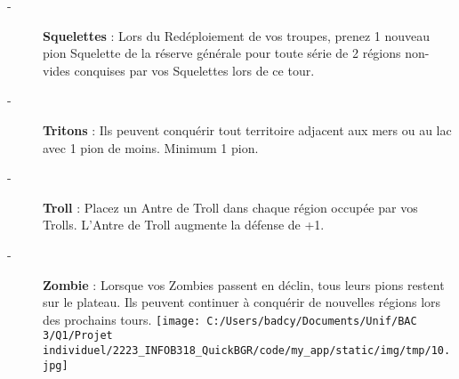 \documentclass{scrartcl}%
\begin{document}
\begin{description}
%
\item[{-} ]%
%
\textcolor{mygreen}{%
\textbf{Squelettes}%
}%
\textit{ }%
 : Lors du Redéploiement de vos troupes, prenez 1 nouveau pion Squelette de la réserve générale pour toute série de 2 régions non{-}vides conquises par vos Squelettes lors de ce tour.
%
\item[{-} ]%
%
\textcolor{mygreen}{%
\textbf{Tritons}%
}%
\textit{ }%
 : Ils peuvent conquérir tout territoire adjacent aux mers ou au lac avec 1 pion de moins. Minimum 1 pion.
%
\item[{-} ]%
%
\textcolor{mygreen}{%
\textbf{Troll}%
}%
\textit{ }%
 : Placez un Antre de Troll dans chaque région occupée par vos Trolls. L’Antre de Troll augmente la défense de +1.
%
\item[{-} ]%
%
\textcolor{mygreen}{%
\textbf{Zombie}%
}%
\textit{ }%
 : Lorsque vos Zombies passent en déclin, tous leurs pions restent sur le plateau. Ils peuvent continuer à conquérir de nouvelles régions lors des prochains tours.%
\texttt{[image: C:/Users/badcy/Documents/Unif/BAC 3/Q1/Projet individuel/2223\_INFOB318\_QuickBGR/code/my\_app/static/img/tmp/10.jpg]}%

%

%
\end{description}

%
\end{document}
